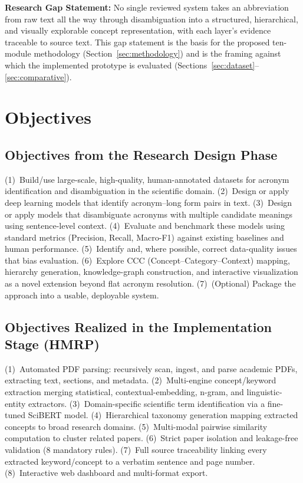 \documentclass[10pt,conference]{IEEEtran}
\begin{document}
\textbf{Research Gap Statement:} No single reviewed system takes an abbreviation from raw text all the way through disambiguation into a structured, hierarchical, and visually explorable concept representation, with each layer's evidence traceable to source text. This gap statement is the basis for the proposed ten-module methodology (Section~\ref{sec:methodology}) and is the framing against which the implemented prototype is evaluated (Sections~\ref{sec:dataset}--\ref{sec:comparative}).

\section{Objectives}
\subsection{Objectives from the Research Design Phase}
(1)~Build/use large-scale, high-quality, human-annotated datasets for acronym identification and disambiguation in the scientific domain. (2)~Design or apply deep learning models that identify acronym--long form pairs in text. (3)~Design or apply models that disambiguate acronyms with multiple candidate meanings using sentence-level context. (4)~Evaluate and benchmark these models using standard metrics (Precision, Recall, Macro-F1) against existing baselines and human performance. (5)~Identify and, where possible, correct data-quality issues that bias evaluation. (6)~Explore CCC (Concept--Category--Context) mapping, hierarchy generation, knowledge-graph construction, and interactive visualization as a novel extension beyond flat acronym resolution. (7)~(Optional) Package the approach into a usable, deployable system.

\subsection{Objectives Realized in the Implementation Stage (HMRP)}
(1)~Automated PDF parsing: recursively scan, ingest, and parse academic PDFs, extracting text, sections, and metadata. (2)~Multi-engine concept/keyword extraction merging statistical, contextual-embedding, n-gram, and linguistic-entity extractors. (3)~Domain-specific scientific term identification via a fine-tuned SciBERT model. (4)~Hierarchical taxonomy generation mapping extracted concepts to broad research domains. (5)~Multi-modal pairwise similarity computation to cluster related papers. (6)~Strict paper isolation and leakage-free validation (8 mandatory rules). (7)~Full source traceability linking every extracted keyword/concept to a verbatim sentence and page number. (8)~Interactive web dashboard and multi-format export.
\end{document}
